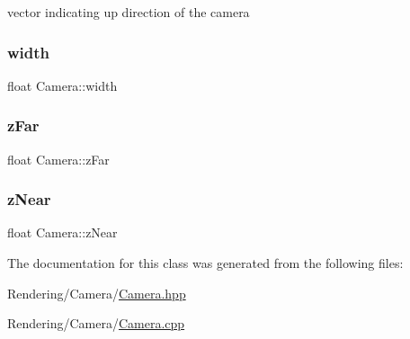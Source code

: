 vector indicating up direction of the camera 

\mbox{\label{classCamera_a6fd29b8dd0cff815956c30f310a9b610}} 
\subsubsection{\texorpdfstring{width}{width}}
{\footnotesize\ttfamily float Camera\+::width\hspace{0.3cm}{\ttfamily [private]}}

\mbox{\label{classCamera_a6290469f972a5903c805725db563f41f}} 
\subsubsection{\texorpdfstring{z\+Far}{zFar}}
{\footnotesize\ttfamily float Camera\+::z\+Far\hspace{0.3cm}{\ttfamily [private]}}

\mbox{\label{classCamera_a1db2166635ff27594eda3a23130b66ac}} 
\subsubsection{\texorpdfstring{z\+Near}{zNear}}
{\footnotesize\ttfamily float Camera\+::z\+Near\hspace{0.3cm}{\ttfamily [private]}}



The documentation for this class was generated from the following files\+:\begin{DoxyCompactItemize}
\item 
Rendering/\+Camera/\mbox{\hyperlink{Camera_8hpp}{Camera.\+hpp}}\item 
Rendering/\+Camera/\mbox{\hyperlink{Camera_8cpp}{Camera.\+cpp}}\end{DoxyCompactItemize}
